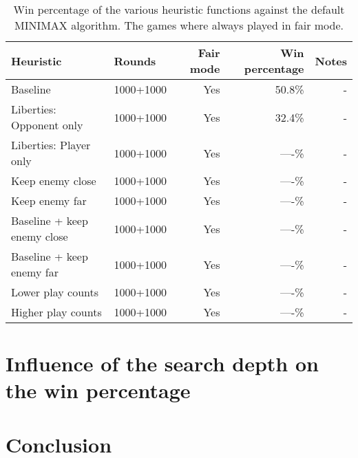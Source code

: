 \documentclass[aps,prd,notitlepage,floatfix,superscriptaddress,groupedaddress,nofootinbib]{revtex4-1}
\begin{document}
\begin{table}[H]
    \centering
    \caption{Win percentage of the various heuristic functions against the default MINIMAX algorithm. The games where always played in fair mode.}
    \label{tab:win_percentage_heuristics}
    \begin{ruledtabular}
        \begin{tabular}{l|l|r|r|r}
            Heuristic                   & Rounds  & Fair mode     & Win percentage    & Notes \\
            \toprule
            Baseline                    & 1000+1000 & Yes           & 50.8\%            & -     \\
            Liberties: Opponent only    & 1000+1000 & Yes           & 32.4\%            & -     \\
            Liberties: Player only      & 1000+1000 & Yes           & ----\%            & -     \\
            Keep enemy close            & 1000+1000 & Yes           & ----\%            & -     \\
            Keep enemy far              & 1000+1000 & Yes           & ----\%            & -     \\
            Baseline + keep enemy close & 1000+1000 & Yes           & ----\%            & -     \\
            Baseline + keep enemy far   & 1000+1000 & Yes           & ----\%            & -     \\
            Lower play counts           & 1000+1000 & Yes           & ----\%            & -     \\
            Higher play counts          & 1000+1000 & Yes           & ----\%            & -     \\
        \end{tabular}
    \end{ruledtabular}
\end{table}

\section{Influence of the search depth on the win percentage}

\section{Conclusion}





%

\end{document}
